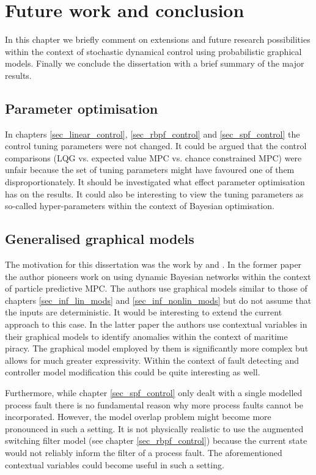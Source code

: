 \chapter{Future work and conclusion}
In this chapter we briefly comment on extensions and future research possibilities within the context of stochastic dynamical control using probabilistic graphical models. Finally we conclude the dissertation with a brief summary of the major results.

\section{Parameter optimisation}
In chapters \ref{sec_linear_control}, \ref{sec_rbpf_control} and \ref{sec_spf_control} the control tuning parameters were not changed. It could be argued that the control comparisons (LQG vs. expected value MPC vs. chance constrained MPC) were unfair because the set of tuning parameters might have favoured one of them disproportionately. It should be investigated what effect parameter optimisation has on the results. It could also be interesting to view the tuning parameters as so-called hyper-parameters within the context of Bayesian optimisation. 

\section{Generalised graphical models}
The motivation for this dissertation was the work by \cite{devilliers} and \cite{dabrowski}. In the former paper the author pioneers work on using dynamic Bayesian networks within the context of particle predictive MPC. The authors use graphical models similar to those of chapters \ref{sec_inf_lin_mods} and \ref{sec_inf_nonlin_mods} but do not assume that the inputs are deterministic. It would be interesting to extend the current approach to this case. In the latter paper the authors use contextual variables in their graphical models to identify anomalies within the context of maritime piracy. The graphical model employed by them is significantly more complex but allows for much greater expressivity. Within the context of fault detecting and controller model modification this could be quite interesting as well.

Furthermore, while chapter \ref{sec_spf_control} only dealt with a single modelled process fault there is no fundamental reason why more process faults cannot be incorporated. However, the model overlap problem might become more pronounced in such a setting. It is not physically realistic to use the augmented switching filter model (see chapter \ref{sec_rbpf_control}) because the current state would not reliably inform the filter of a process fault. The aforementioned contextual variables could become useful in such a setting.

